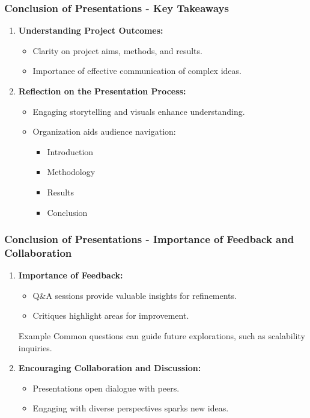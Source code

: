 \documentclass[aspectratio=169]{beamer}
\begin{document}
\begin{frame}[fragile]
    \frametitle{Conclusion of Presentations - Key Takeaways}
    \begin{enumerate}
        \item \textbf{Understanding Project Outcomes:}
            \begin{itemize}
                \item Clarity on project aims, methods, and results.
                \item Importance of effective communication of complex ideas.
            \end{itemize}
        \item \textbf{Reflection on the Presentation Process:}
            \begin{itemize}
                \item Engaging storytelling and visuals enhance understanding.
                \item Organization aids audience navigation: 
                    \begin{itemize}
                        \item Introduction
                        \item Methodology
                        \item Results
                        \item Conclusion
                    \end{itemize}
            \end{itemize}
    \end{enumerate}
\end{frame}

\begin{frame}[fragile]
    \frametitle{Conclusion of Presentations - Importance of Feedback and Collaboration}
    \begin{enumerate}[resume]
        \item \textbf{Importance of Feedback:}
            \begin{itemize}
                \item Q\&A sessions provide valuable insights for refinements.
                \item Critiques highlight areas for improvement.
            \end{itemize}
            \begin{block}{Example}
                Common questions can guide future explorations, such as scalability inquiries.
            \end{block}

        \item \textbf{Encouraging Collaboration and Discussion:}
            \begin{itemize}
                \item Presentations open dialogue with peers.
                \item Engaging with diverse perspectives sparks new ideas.
            \end{itemize}
    \end{enumerate}
\end{frame}
\end{document}
